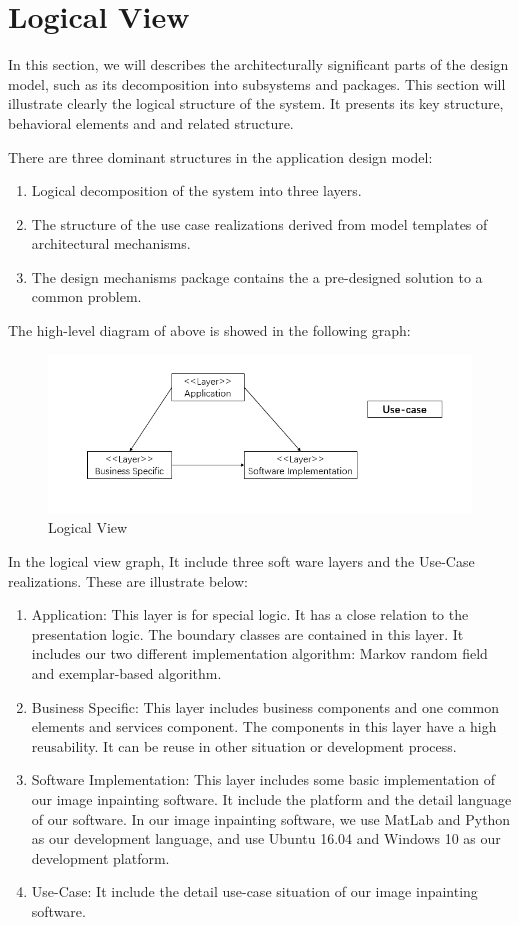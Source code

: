 \documentclass[12pt]{article}
\begin{document}
\section{Logical View}
\qquad In this section, we will describes the architecturally significant parts of the design model, such as its decomposition into subsystems and packages. This section will illustrate clearly the logical structure of the system. It presents its key structure, behavioral elements and and related structure.

There are three dominant structures in the application design model:
\begin{enumerate}
	\item Logical decomposition of the system into three layers.
	\item The structure of the use case realizations derived from model templates of architectural mechanisms.
	\item The design mechanisms package contains the a pre-designed solution to a common problem. 
\end{enumerate}

The high-level diagram of above is showed in the following graph:
\begin{figure}[H]
	\centering
	\includegraphics[width=1.0\linewidth]{logical.jpg}
	\caption{Logical View}
\end{figure}


In the logical view graph, It include three soft ware layers and the Use-Case realizations. These are illustrate below:
\begin{enumerate}
	\item Application: This layer is for special logic. It has a close relation to the presentation logic. The boundary classes are contained in this layer. It includes our two different implementation algorithm: Markov random field and exemplar-based algorithm.
	\item Business Specific: This layer includes business components and one common elements and services component. The components in this layer have a high reusability. It can be reuse in other situation or development process.
	\item Software Implementation: This layer includes some basic implementation of our image inpainting software. It include the platform and the detail language of our software. In our image inpainting software, we use MatLab and Python as our development language, and use Ubuntu 16.04 and Windows 10 as our development platform.
	\item Use-Case: It include the detail use-case situation of our image inpainting software.
\end{enumerate}
\end{document}
